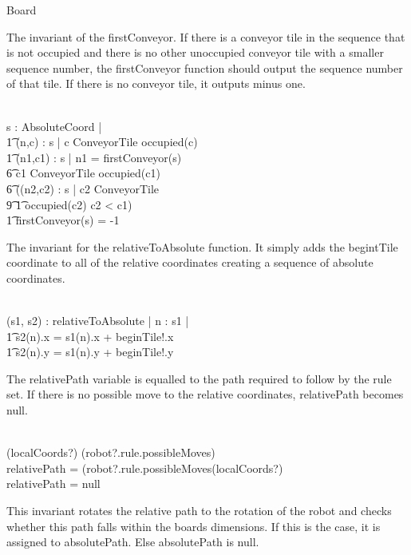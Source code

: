 \begin{class}{Board}
\znewpage
\begin{nobothschema}
\begin{zpar}
The invariant of the firstConveyor. If there is a conveyor tile in the sequence that is not occupied and there is no other unoccupied conveyor tile with a smaller sequence number, the firstConveyor function should output the sequence number of that tile. If there is no conveyor tile, it outputs minus one.
\end{zpar} \\
\forall s : \power \seq AbsoluteCoord | \\ \t1
 \IF \exists (n,c) : s | c \in ConveyorTile \wedge \neg occupied(c) \\ \t1
 \THEN \exists (n1,c1) : s | n1 = firstConveyor(s) \; \; \wedge \\ \t6 c1 \in ConveyorTile \wedge \neg occupied(c1) \; \; \wedge \\ \t6
 (\neg \exists (n2,c2) : s | c2 \in ConveyorTile \; \; \wedge \\ \t9 \t1 \neg occupied(c2) \wedge c2 < c1) \\ \t1
 \ELSE firstConveyor(s) = -1 \\
\also \also \also
\begin{zpar}
The invariant for the relativeToAbsolute function. It simply adds the begintTile coordinate to all of the relative coordinates creating a sequence of absolute coordinates.
\end{zpar} \\
\forall (s1, s2) : relativeToAbsolute | \forall n : \dom s1 | \\ \t1 s2(n).x = s1(n).x + beginTile!.x \; \; \wedge \\ \t1 s2(n).y = s1(n).y + beginTile!.y
\also \also \also
\begin{zpar}
The relativePath variable is equalled to the path required to follow by the rule set. If there is no possible move to the relative coordinates, relativePath becomes null.
\end{zpar} \\
\IF (localCoords?) \in \dom (robot?.rule.possibleMoves) \\
\THEN relativePath = \dom (robot?.rule.possibleMoves(localCoords?) \\
\ELSE relativePath = null \\
\also \also \also
\begin{zpar}
This invariant rotates the relative path to the rotation of the robot and checks whether this path falls within the boards dimensions. If this is the case, it is assigned to absolutePath. Else absolutePath is null.

\end{zpar}
\end{nobothschema}
\end{class}
